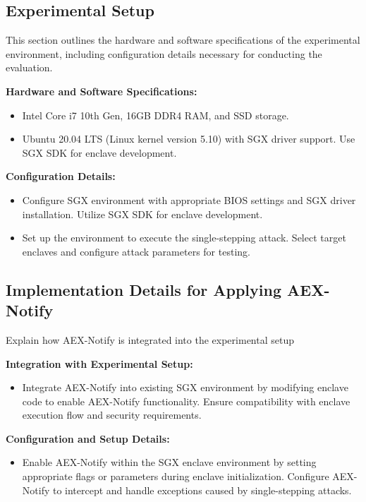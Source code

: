 \documentclass{llncs}
\begin{document}
\subsection{Experimental Setup}

This section outlines the hardware and software specifications of the experimental environment, including configuration details necessary for conducting the evaluation.

\textbf{Hardware and Software Specifications:}
\begin{itemize}
  \item Intel Core i7 10th Gen, 16GB DDR4 RAM, and SSD storage.
  \item Ubuntu 20.04 LTS (Linux kernel version 5.10) with SGX driver support. Use SGX SDK for enclave development.
\end{itemize}

\textbf{Configuration Details:}
\begin{itemize}
  \item
    Configure SGX environment with appropriate BIOS settings and SGX driver installation.
    Utilize SGX SDK for enclave development.
  \item
    Set up the environment to execute the single-stepping attack.
    Select target enclaves and configure attack parameters for testing.
\end{itemize}

\subsection{Implementation Details for Applying AEX-Notify}

Explain how AEX-Notify is integrated into the experimental setup

\textbf{Integration with Experimental Setup:}
\begin{itemize}
  \item
    Integrate AEX-Notify into existing SGX environment
    by modifying enclave code to enable AEX-Notify functionality.
    Ensure compatibility with enclave execution flow and security requirements.
\end{itemize}

\textbf{Configuration and Setup Details:}
\begin{itemize}
  \item Enable AEX-Notify within the SGX enclave environment
    by setting appropriate flags or parameters during enclave initialization.
    Configure AEX-Notify to intercept and handle exceptions caused by single-stepping attacks.
\end{itemize}
\end{document}
